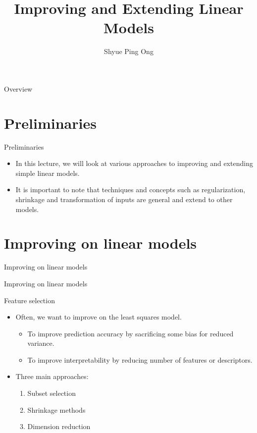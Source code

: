 \documentclass[aspectratio=169]{beamer}
\title[Improving and Extending Linear Models]{Improving and Extending Linear Models}
\author{Shyue Ping Ong}
\institute[UCSD]{University of California, San Diego\\
\medskip
}
\date{\classyear}
\begin{document}
\begin{frame}
    \titlepage %
\end{frame}


\begin{frame}{Overview}
    \tableofcontents
\end{frame}


\section{Preliminaries}

\begin{frame}{Preliminaries}
    \begin{itemize}
        \item In this lecture, we will look at various approaches to improving and extending simple linear models.
        \item It is important to note that techniques and concepts such as regularization, shrinkage and transformation of inputs are general and extend to other models.
    \end{itemize}
\end{frame}


\section{Improving on linear models}


\begin{frame}{Improving on linear models}
    \Huge{\centerline{Improving on linear models}}
\end{frame} 

\begin{frame}{Feature selection}
    \begin{itemize}
        \item Often, we want to improve on the least squares model.
        \begin{itemize}
            \item To improve prediction accuracy by sacrificing some bias for reduced variance.
            \item To improve interpretability by reducing number of features or descriptors.
        \end{itemize}
        \item Three main approaches:
        \begin{enumerate}
            \item Subset selection
            \item Shrinkage methods
            \item Dimension reduction
        \end{enumerate}
    \end{itemize}
\end{frame}
\end{document}
